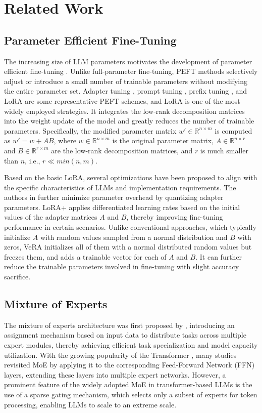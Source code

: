 \section{Related Work}\label{sec:relatedwork}
\subsection{Parameter Efficient Fine-Tuning}
The increasing size of LLM parameters motivates the development of parameter efficient fine-tuning \cite{han2024parameter}. Unlike full-parameter fine-tuning, PEFT methods selectively adjust or introduce a small number of trainable parameters without modifying the entire parameter set. Adapter tuning \cite{houlsby2019parameter}, prompt tuning \cite{lester2021power}, prefix tuning \cite{li2021prefix}, and LoRA \cite{hulora} are some representative PEFT schemes, and LoRA is one of the most widely employed strategies. It integrates the low-rank decomposition matrices into the weight update of the model and greatly reduces the number of trainable parameters. Specifically, the modified parameter matrix $w'\in \mathbb{R}^{n\times m}$ is computed as $w'=w+AB$, where $w \in \mathbb{R}^{n\times m}$ is the original parameter matrix, $A\in \mathbb{R}^{n\times r}$ and $B \in \mathbb{R}^{r\times m}$ are the low-rank decomposition matrices, and $r$ is much smaller than $n$, i.e., $r\ll min(n,m)$. 

Based on the basic LoRA, several optimizations have been proposed to align with the specific characteristics of LLMs and implementation requirements. The authors in \cite{dettmers2024qlora} further minimize parameter overhead by quantizing adapter parameters. LoRA+ \cite{hayoulora} applies differentiated learning rates based on the initial values of the adapter matrices $A$ and $B$, thereby improving fine-tuning performance in certain scenarios. Unlike conventional approaches, which typically initialize $A$ with random values sampled from a normal distribution and $B$ with zeros, VeRA \cite{kopiczkovera} initializes all of them with a normal distributed random values but freezes them, and adds a trainable vector for each of $A$ and $B$. It can further reduce the trainable parameters involved in fine-tuning with slight accuracy sacrifice.

\subsection{Mixture of Experts}
The mixture of experts architecture was first proposed by \cite{jacobs1991adaptive}, introducing an assignment mechanism based on input data to distribute tasks across multiple expert modules, thereby achieving efficient task specialization and model capacity utilization. 
With the growing popularity of the Transformer \cite{vaswani2017attention}, many studies revisited MoE by applying it to the corresponding Feed-Forward Network (FFN) layers, extending these layers into multiple expert networks. However, a prominent feature of the widely adopted MoE in transformer-based LLMs is the use of a sparse gating mechanism, which selects only a subset of experts for token processing, enabling LLMs to scale to an extreme scale. 

